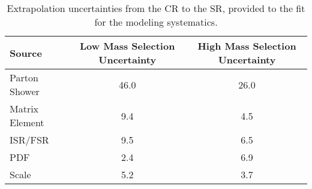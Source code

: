 \begin{table}
\centering
\begin{tabular}{l|cc}
\hline
Source               &  Low Mass Selection Uncertainty   & High Mass Selection Uncertainty   \\\hline\hline 
Parton Shower        &               46.0                &              26.0                 \\\hline
Matrix Element       &               9.4                 &              4.5                 \\\hline
ISR/FSR              &               9.5                 &             6.5                 \\\hline
PDF                  &               2.4                 &               6.9                 \\\hline
Scale                &               5.2                 &               3.7                 \\\hline\hline

\end{tabular}
\caption{Extrapolation uncertainties from the CR to the SR,  provided to the fit for the \ttbar modeling systematics.}
\label{tab:ttbarModeling}
\end{table}



\iffalse
An uncertainty on the shape of the $m_{hh}$  for $t\bar{t}$ is derived
comparing  the default Powheg+Herwig++ sample with the distribution obtained
using aMC@NLO+Heriwg++ as alternative generator. Additional systematic
uncertainties are evaluated by comparing the nominal sample showered
with Pythia to one showered with Herwig++. Sample with renormalisation
and factorisation scales doubled
and halved are also available and used as systematic uncertainty. 
The Samples used for the systematic uncertainties are the following:

\begin{itemize}
\item mc15\_13TeV.410000.PowhegPythiaEvtGen\_P2012\_ttbar\_hdamp172p5\_nonallhad - Nominal
\item mc15\_13TeV.410003.aMcAtNloHerwigppEvtGen\_ttbar\_nonallhad - TTBarMCNLO
\item mc15\_13TeV.410004.PowhegHerwigppEvtGen\_UEEE5\_ttbar\_hdamp172p5\_nonallhad - TTBarHerwig
\end{itemize}
\fi

